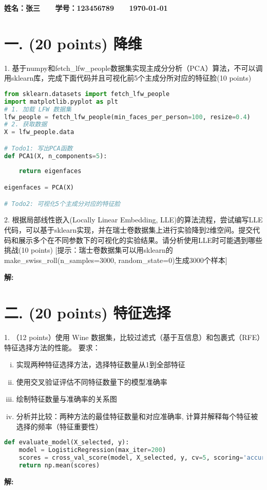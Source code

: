 \documentclass[8pt]{article}
\begin{document}
\textbf{\color{blue} \Large 姓名：张三 \ \ \ 学号：123456789 \ \ \ \today}

\section*{一. (20 points) 降维}
1. 基于numpy和fetch\_lfw\_people数据集实现主成分分析（PCA）算法，不可以调用sklearn库，完成下面代码并且可视化前5个主成分所对应的特征脸(10 points)

\begin{lstlisting}[language=Python]
from sklearn.datasets import fetch_lfw_people
import matplotlib.pyplot as plt
# 1. 加载 LFW 数据集
lfw_people = fetch_lfw_people(min_faces_per_person=100, resize=0.4)
# 2. 获取数据
X = lfw_people.data  

# Todo1: 写出PCA函数
def PCA1(X, n_components=5):
    
    return eigenfaces

eigenfaces = PCA(X)

# Todo2: 可视化5个主成分对应的特征脸
\end{lstlisting}



2. 根据局部线性嵌入(Locally Linear Embedding, LLE)的算法流程，尝试编写LLE代码，可以基于sklearn实现，并在瑞士卷数据集上进行实验降到2维空间。提交代码和展示多个在不同参数下的可视化的实验结果。请分析使用LLE时可能遇到哪些挑战(10 points) [提示：瑞士卷数据集可以用sklearn的make\_swiss\_roll(n\_samples=3000, random\_state=0)生成3000个样本]

\textbf{\large 解:}
\vspace{3em}

\newpage
\section*{二. (20 points) 特征选择}
1. （12 points）使用 Wine 数据集，比较过滤式（基于互信息）和包裹式（RFE）特征选择方法的性能。
要求：
\begin{enumerate}[(i)]
    \item 实现两种特征选择方法，选择特征数量从1到全部特征
    \item 使用交叉验证评估不同特征数量下的模型准确率
    \item 绘制特征数量与准确率的关系图
    \item 分析并比较：两种方法的最佳特征数量和对应准确率, 计算并解释每个特征被选择的频率（特征重要性）
\end{enumerate}
\begin{lstlisting}[language=Python, caption=评估对应选择特征的准确率]
def evaluate_model(X_selected, y):
    model = LogisticRegression(max_iter=200)
    scores = cross_val_score(model, X_selected, y, cv=5, scoring='accuracy')
    return np.mean(scores)
\end{lstlisting}
\textbf{\large 解:}
\vspace{3em}
\end{document}
